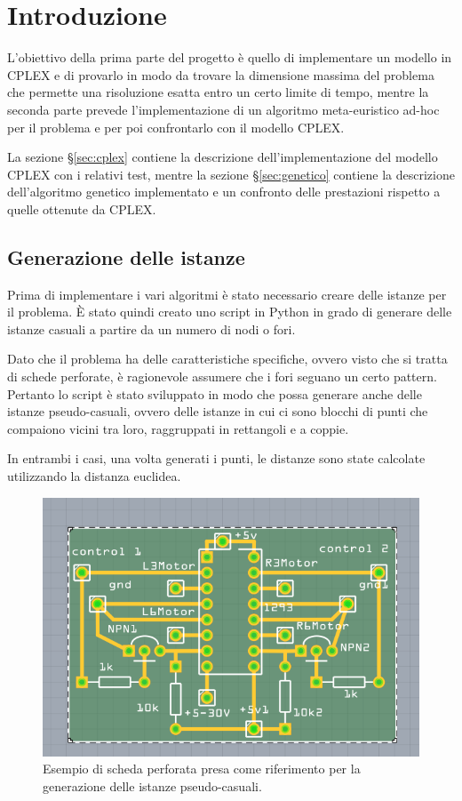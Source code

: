 
\section{Introduzione}

L'obiettivo della prima parte del progetto è quello di implementare un modello in CPLEX e di provarlo in modo da trovare la dimensione massima del problema che permette una risoluzione esatta entro un certo limite di tempo, mentre la seconda parte prevede l'implementazione di un algoritmo meta-euristico ad-hoc per il problema e per poi confrontarlo con il modello CPLEX.

La sezione §\ref{sec:cplex} contiene la descrizione dell'implementazione del modello CPLEX con i relativi test, mentre la sezione §\ref{sec:genetico} contiene la descrizione dell'algoritmo genetico implementato e un confronto delle prestazioni rispetto a quelle ottenute da CPLEX.

\subsection{Generazione delle istanze}

Prima di implementare i vari algoritmi è stato necessario creare delle istanze per il problema.
\`E stato quindi creato uno script in Python in grado di generare delle istanze casuali a partire da un numero di nodi o fori.

Dato che il problema ha delle caratteristiche specifiche, ovvero visto che si tratta di schede perforate, è ragionevole assumere che i fori seguano un certo pattern.
Pertanto lo script è stato sviluppato in modo che possa generare anche delle istanze pseudo-casuali, ovvero delle istanze in cui ci sono blocchi di punti che compaiono vicini tra loro, raggruppati in rettangoli e a coppie.

In entrambi i casi, una volta generati i punti, le distanze sono state calcolate utilizzando la distanza euclidea.

\begin{figure}[htbp]
	\centering
	\includegraphics[width=.5\textwidth]{immagini/scheda.png}
	\caption{Esempio di scheda perforata presa come riferimento per la generazione delle istanze pseudo-casuali.}
\end{figure}